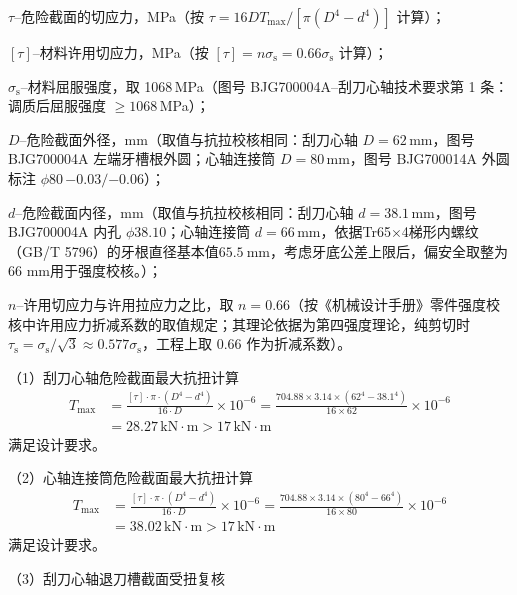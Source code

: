 $\tau$--危险截面的切应力，MPa（按 $\tau = 16DT_{\max}/[\pi(D^4-d^4)]$ 计算）；

$[\tau]$--材料许用切应力，MPa（按 $[\tau]=n\sigma_{\mathrm{s}} = 0.66\sigma_{\mathrm{s}}$ 计算）；

$\sigma_{\mathrm{s}}$--材料屈服强度，取 1068\,MPa（图号 BJG700004A--刮刀心轴技术要求第 1 条：调质后屈服强度 $\ge 1068$\,MPa）；

$D$--危险截面外径，mm（取值与抗拉校核相同：刮刀心轴 $D = 62$\,mm，图号 BJG700004A 左端牙槽根外圆；心轴连接筒 $D = 80$\,mm，图号 BJG700014A 外圆标注 $\phi 80\,{-0.03}/{-0.06}$）；

$d$--危险截面内径，mm（取值与抗拉校核相同：刮刀心轴 $d = 38.1$\,mm，图号 BJG700004A 内孔 $\phi 38.10$；心轴连接筒 $d = 66$\,mm，依据Tr65$\times$4梯形内螺纹（GB/T 5796）的牙根直径基本值$65.5\ \mathrm{mm}$，考虑牙底公差上限后，偏安全取整为66 mm用于强度校核。）；

$n$--许用切应力与许用拉应力之比，取 $n = 0.66$（按《机械设计手册》零件强度校核中许用应力折减系数的取值规定\cite{ref26}；其理论依据为第四强度理论，纯剪切时 $\tau_{\mathrm{s}} = \sigma_{\mathrm{s}}/\sqrt{3} \approx 0.577\sigma_{\mathrm{s}}$，工程上取 $0.66$ 作为折减系数）。

（1）刮刀心轴危险截面最大抗扭计算
\begin{equation}
    \begin{aligned}
    T_{\max} &= \frac{[\tau] \cdot \pi \cdot (D^4 - d^4)}{16 \cdot D} \times 10^{-6}
             = \frac{704.88 \times 3.14 \times (62^4 - 38.1^4)}{16 \times 62} \times 10^{-6} \\
             &= 28.27\,\mathrm{kN}\cdot\mathrm{m} > 17\,\mathrm{kN}\cdot\mathrm{m}
\end{aligned}
\end{equation}
满足设计要求。

（2）心轴连接筒危险截面最大抗扭计算
\begin{equation}
    \begin{aligned}
    T_{\max} &= \frac{[\tau] \cdot \pi \cdot (D^4 - d^4)}{16 \cdot D} \times 10^{-6}
             = \frac{704.88 \times 3.14 \times (80^4 - 66^4)}{16 \times 80} \times 10^{-6} \\
             &= 38.02\,\mathrm{kN}\cdot\mathrm{m} > 17\,\mathrm{kN}\cdot\mathrm{m}
\end{aligned}
\end{equation}
满足设计要求。

（3）刮刀心轴退刀槽截面受扭复核

